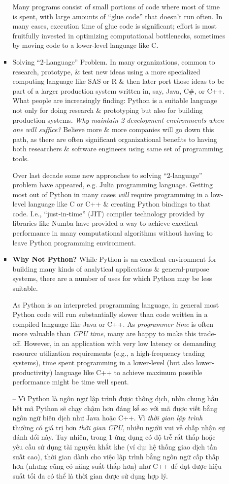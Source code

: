 \documentclass{article}
\begin{document}
\begin{itemize}
\begin{itemize}
\begin{itemize}
			Many programs consist of small portions of code where most of time is spent, with large amounts of ``glue code'' that doesn't run often. In many cases, execution time of glue code is significant; effort is most fruitfully invested in optimizing computational bottlenecks, sometimes by moving code to a lower-level language like C.
			\item {\sf Solving ``2-Language'' Problem.} In many organizations, common to research, prototype, \& test new ideas using a more specialized computing language like SAS or R \& then later port those ideas to be part of a larger production system written in, say, Java, C\#, or C++. What people are increasingly finding: Python is a suitable language not only for doing research \& prototyping but also for building production systems. {\it Why maintain 2 development environments when one will suffice?} Believe more \& more companies will go down this path, as there are often significant organizational benefits to having both researchers \& software engineers using same set of programming tools.
			
			Over last decade some new approaches to solving ``2-language'' problem have appeared, e.g. Julia programming language. Getting most out of Python in many cases {\it will} require programming in a low-level language like C or C++ \& creating Python bindings to that code. I.e., ``just-in-time'' (JIT) compiler technology provided by libraries like Numba have provided a way to achieve excellent performance in many computational algorithms without having to leave Python programming environment.
			\item {\bf Why Not Python?} While Python is an excellent environment for building many kinds of analytical applications \& general-purpose systems, there are a number of uses for which Python may be less suitable.
			
			As Python is an interpreted programming language, in general most Python code will run substantially slower than code written in a compiled language like Java or C++. As {\it programmer time} is often more valuable than {\it CPU time}, many are happy to make this trade-off. However, in an application with very low latency or demanding resource utilization requirements (e.g., a high-frequency trading systems), time spent programming in a lower-level (but also lower-productivity) language like C++ to achieve maximum possible performance might be time well spent.
			
			-- Vì Python là ngôn ngữ lập trình được thông dịch, nhìn chung hầu hết mã Python sẽ chạy chậm hơn đáng kể so với mã được viết bằng ngôn ngữ biên dịch như Java hoặc C++. Vì {\it thời gian lập trình} thường có giá trị hơn {\it thời gian CPU}, nhiều người vui vẻ chấp nhận sự đánh đổi này. Tuy nhiên, trong 1 ứng dụng có độ trễ rất thấp hoặc yêu cầu sử dụng tài nguyên khắt khe (ví dụ: hệ thống giao dịch tần suất cao), thời gian dành cho việc lập trình bằng ngôn ngữ cấp thấp hơn (nhưng cũng có năng suất thấp hơn) như C++ để đạt được hiệu suất tối đa có thể là thời gian được sử dụng hợp lý.
			

\end{itemize}
\end{itemize}
\end{itemize}
\end{document}

